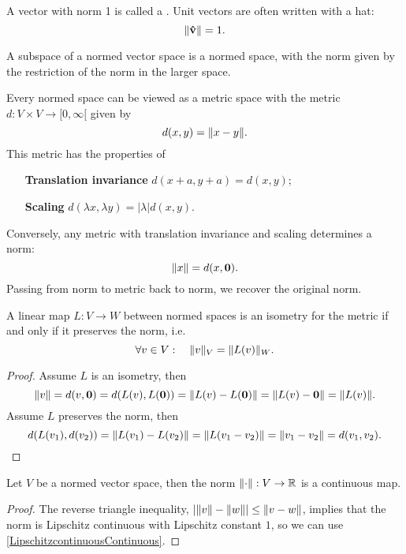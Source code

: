 \begin{definition}
A vector with norm 1 is called a . Unit vectors are often written with a hat:
\[ \lVert\boldsymbol{\mathrm{\hat{v}}}\rVert = 1. \]
\end{definition}

\begin{lemma}
A subspace of a normed vector space is a normed space, with the norm given by the restriction of the norm in the larger space.
\end{lemma}

\begin{proposition}
Every normed space can be viewed as a metric space with the metric $d:V\times V \to [0,\infty[$ given by
\[ d(x,y) = \lVert x-y\rVert. \]
This metric has the properties of
\begin{itemize}[leftmargin=6cm]
\item[\textbf{Translation invariance}] $d(x+a, y+a) = d(x,y)$;
\item[\textbf{Scaling}] $d(\lambda x, \lambda y) = |\lambda|d(x,y)$.
\end{itemize}
Conversely, any metric with translation invariance and scaling determines a norm:
\[ \lVert x\rVert = d(x,\boldsymbol{\mathrm{0}}). \]
Passing from norm to metric back to norm, we recover the original norm.
\end{proposition}
\begin{lemma}
A linear map $L:V\to W$ between normed spaces is an isometry for the metric \textup{if and only if} it preserves the norm, i.e.\
\[ \forall v\in V: \quad \lVert v\rVert_V = \lVert L(v)\rVert_W. \]
\end{lemma}
\begin{proof}
Assume $L$ is an isometry, then
\[ \lVert v\rVert = d(v,\boldsymbol{\mathrm{0}}) = d(L(v),L(\boldsymbol{\mathrm{0}})) = \lVert L(v) - L(\boldsymbol{\mathrm{0}})\rVert = \lVert L(v) - \boldsymbol{\mathrm{0}}\rVert = \lVert L(v)\rVert. \]
Assume $L$ preserves the norm, then
\[ d(L(v_1), d(v_2)) = \lVert L(v_1)-L(v_2)\rVert = \lVert L(v_1-v_2)\rVert = \lVert v_1-v_2\rVert = d(v_1,v_2). \]
\end{proof}

\begin{proposition}
Let $V$ be a normed vector space, then the norm $\lVert\cdot\rVert:V\to \mathbb{R}$ is a continuous map.
\end{proposition}
\begin{proof}
The reverse triangle inequality, $|\lVert v\rVert-\lVert w\rVert| \leq \lVert v-w\rVert$, implies that the norm is Lipschitz continuous with Lipschitz constant $1$, so we can use \ref{LipschitzcontinuousContinuous}.
\end{proof}

